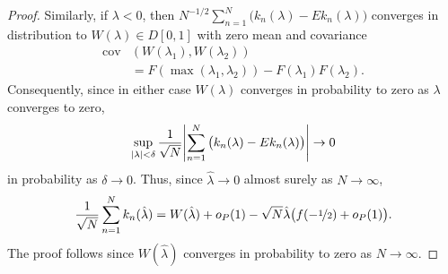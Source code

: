 \documentclass[journal]{../bib/IEEEtran}
\begin{document}
\begin{proof}
Similarly, if $\lambda < 0$, then $N^{-1/2} \sum_{n=1}^{N} \big( k_n(\lambda) - Ek_n(\lambda) \big)$ converges in distribution to $W(\lambda) \in D[0,1]$ with zero mean and covariance
\begin{align*}
\operatorname{cov}&( W(\lambda_1), W(\lambda_2) ) \\
&= F( \max(\lambda_1, \lambda_2) ) - F(\lambda_1) F(\lambda_2).
\end{align*}
Consequently, since in either case $W(\lambda)$ converges in probability to zero as $\lambda$ converges to zero,
\[
\sup_{{\left| \lambda \right|} < \delta} \frac{1}{\sqrt{N}}{\left|  \sum_{n=1}^{N} \big( k_n(\lambda) - Ek_n(\lambda) \big)   \right|} \rightarrow 0
\]
in probability as $\delta \rightarrow 0$. Thus, since $\hat{\lambda} \rightarrow 0$ almost surely as $N\rightarrow\infty$,
\[
\frac{1}{\sqrt{N}}\sum_{n=1}^{N} k_n(\hat{\lambda}) = W(\hat{\lambda}) + o_P(1) - \sqrt{N}\hat{\lambda}\big( f(-\nicefrac{1}{2}) + o_P(1) \big).
\]
The proof follows since $W(\hat{\lambda})$ converges in probability to zero as $N\rightarrow\infty$.
\end{proof}


\end{document}
